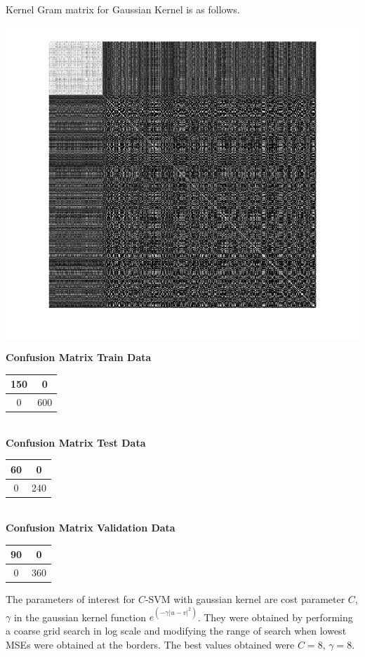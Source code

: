 \documentclass{article}
\begin{document}
Kernel Gram matrix for Gaussian Kernel is as follows.
\begin{center}
\includegraphics[scale=0.6]{Classification/1b/c_g/kgm}
\end{center}

\begin{flushleft}
\textbf{Confusion Matrix Train Data\\[5pt]}
\begin{tabular}{|c|c|}
\hline
150 & 0 \\
\hline
0 & 600\\
\hline
\end{tabular}
\textbf{\\[10pt] Confusion Matrix Test Data \\[5pt]}
\begin{tabular}{|c|c|}
\hline
60 & 0 \\
\hline
0 & 240\\
\hline
\end{tabular}
\textbf{\\[10pt] Confusion Matrix Validation Data \\[5pt]}
\begin{tabular}{|c|c|}
\hline
90 & 0 \\
\hline
0 & 360\\
\hline
\end{tabular}
\end{flushleft}


The parameters of interest for $C$-SVM with gaussian kernel are cost parameter $C$, $\gamma$ in the gaussian kernel function $e^{(-\gamma|u-v|^{2})}$. They were obtained by performing a coarse grid search in log scale and modifying the range of search when lowest MSEs were obtained at the borders.
The best values obtained were $C=8$, $\gamma=8$.
\end{document}
